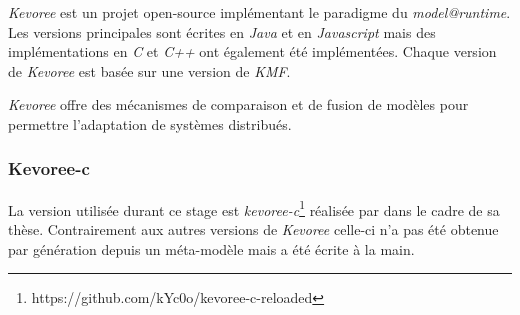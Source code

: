 \emph{Kevoree} est un projet open-source implémentant le paradigme du \emph{model@runtime}. Les versions principales sont écrites en \emph{Java} et en \emph{Javascript} mais des implémentations en \emph{C} et \emph{C++} ont également été implémentées. Chaque version de \emph{Kevoree} est basée sur une version de \emph{KMF}. 

\emph{Kevoree} offre des mécanismes de comparaison et de fusion de modèles pour permettre l'adaptation de systèmes distribués.

\subsubsection{Kevoree-c}

La version utilisée durant ce stage est \emph{kevoree-c}\footnote{https://github.com/kYc0o/kevoree-c-reloaded} réalisée par \paco dans le cadre de sa thèse. Contrairement aux autres versions de \emph{Kevoree} celle-ci n'a pas été obtenue par génération depuis un méta-modèle mais a été écrite à la main.


